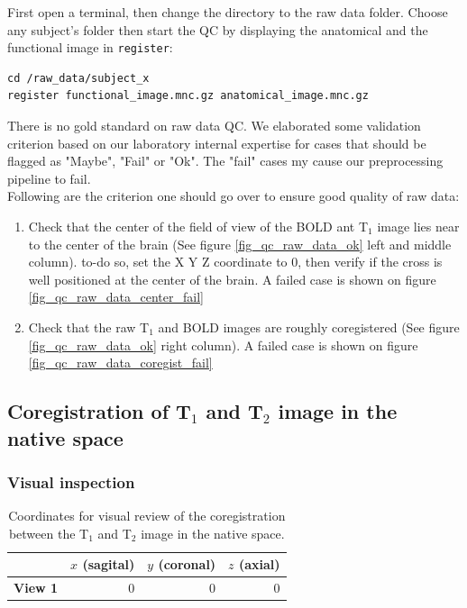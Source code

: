 \documentclass[12pt]{paper}%
\begin{document}
First open a terminal, then change the directory to the raw data folder. Choose any subject's folder then start the QC  by displaying the anatomical and the functional image in \texttt{register}:

\begin{lstlisting}
cd /raw_data/subject_x
register functional_image.mnc.gz anatomical_image.mnc.gz
\end{lstlisting}

There is no gold standard on raw data QC. We elaborated some validation criterion based on our laboratory internal expertise for cases that should be flagged as "Maybe", "Fail" or "Ok". The "fail" cases my cause our preprocessing pipeline to fail. \\
Following are the criterion one should go over to ensure good quality of raw data:
\begin{enumerate}
\item Check that the center of the field of view of the BOLD ant T$_1$ image lies near to the center of the brain (See figure \ref{fig_qc_raw_data_ok} left and middle column). to-do so, set the  X Y Z coordinate to 0, then verify if the cross is well positioned at the center of the brain. A failed case is shown on figure \ref{fig_qc_raw_data_center_fail}
\item Check that the raw T$_1$ and BOLD images are roughly coregistered (See figure \ref{fig_qc_raw_data_ok} right column). A failed case is shown on figure \ref{fig_qc_raw_data_coregist_fail}
\end{enumerate}


\subsection{Coregistration of T$_1$ and T$_2$ image in the native space}

\subsubsection{Visual inspection}
\begin{table}[htbp]
\centering
\captionsetup{justification=centering,margin=2cm}
 \begin{tabular}{c|rrr}
 & $x$ (sagital) & $y$ (coronal) & $z$ (axial)\\
  \hline
 \textbf{View 1} & 0 & 0 & 0\\
 \end{tabular} 
 \caption{Coordinates for visual review of the coregistration between the T$_1$ and T$_2$ image in the native space.}
 \label{tab_coord_t1_raw}
\end{table}
 
\end{document}

